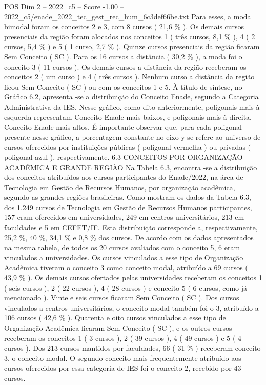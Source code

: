 \begin{textsample}{POS Dim 2 – 2022\_c5 – Score -1.00 – 2022\_c5/enade\_2022\_tec\_gest\_rec\_hum\_6c3def66be.txt}
Para esses, a moda bimodal foram os conceitos 2 e 3, com 8 cursos ( 21,6 \% ).
Os demais cursos presenciais da região foram alocados nos conceitos 1 ( três cursos, 8,1 \% ), 4 ( 2 cursos, 5,4 \% ) e 5 ( 1 curso, 2,7 \% ).
Quinze cursos presenciais da região ficaram Sem Conceito ( SC ).
Para os 16 cursos a distância ( 30,2 \% ), a moda foi o conceito 3 ( 11 cursos ).
Os demais cursos a distância da região receberam os conceitos 2 ( um curso ) e 4 ( três cursos ).
Nenhum curso a distância da região ficou Sem Conceito ( SC ) ou com os conceitos 1 e 5.
À título de síntese, no Gráfico 6.2, apresenta -se a distribuição do Conceito Enade, segundo a Categoria Administrativa da IES.
Nesse gráfico, como dito anteriormente, poligonais mais à esquerda representam Conceito Enade mais baixos, e poligonais mais à direita, Conceito Enade mais altos.
É importante observar que, para cada poligonal presente nesse gráfico, a porcentagem constante no eixo y se refere ao universo de cursos oferecidos por instituições públicas ( poligonal vermelha ) ou privadas ( poligonal azul ), respectivamente. 6.3 CONCEITOS POR ORGANIZAÇÃO ACADÊMICA E GRANDE REGIÃO Na Tabela 6.3, encontra -se a distribuição dos conceitos atribuídos aos cursos participantes do Enade/2022, na área de Tecnologia em Gestão de Recursos Humanos, por organização acadêmica, segundo as grandes regiões brasileiras.
Como mostram os dados da Tabela 6.3, dos 1.249 cursos de Tecnologia em Gestão de Recursos Humanos participantes, 157 eram oferecidos em universidades, 249 em centros universitários, 213 em faculdades e 5 em CEFET/IF.
Esta distribuição corresponde a, respectivamente, 25,2 \%, 40 \%, 34,1 \% e 0,8 \% dos cursos.
De acordo com os dados apresentados na mesma tabela, de todos os 20 cursos avaliados com o conceito 5, 6 eram vinculados a universidades.
Os cursos vinculados a esse tipo de Organização Acadêmica tiveram o conceito 3 como conceito modal, atribuído a 69 cursos ( 43,9 \% ).
Os demais cursos ofertados pelas universidades receberam os conceitos 1 ( seis cursos ), 2 ( 22 cursos ), 4 ( 28 cursos ) e conceito 5 ( 6 cursos, como já mencionado ).
Vinte e seis cursos ficaram Sem Conceito ( SC ).
Dos cursos vinculados a centros universitários, o conceito modal também foi o 3, atribuído a 106 cursos ( 42,6 \% ).
Quarenta e oito cursos vinculados a esse tipo de Organização Acadêmica ficaram Sem Conceito ( SC ), e os outros cursos receberam os conceitos 1 ( 3 cursos ), 2 ( 39 cursos ), 4 ( 49 cursos ) e 5 ( 4 cursos ).
Dos 213 cursos mantidos por faculdades, 66 ( 31 \% ) receberam conceito 3, o conceito modal.
O segundo conceito mais frequentemente atribuído aos cursos oferecidos por essa categoria de IES foi o conceito 2, recebido por 43 cursos.

\end{textsample}
